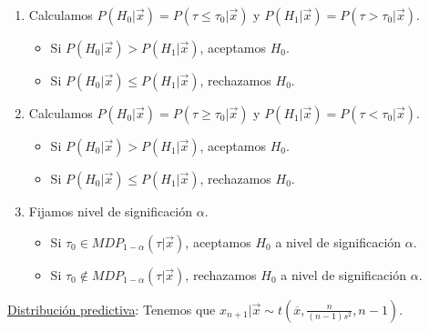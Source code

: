 \begin{enumerate}
    \item Calculamos $P(H_0 | \vec{x}) = P(\tau\leq \tau_0 |\vec{x})$ y $P(H_1 | \vec{x}) = P(\tau> \tau_0 | \vec{x})$.
          \begin{itemize}
              \item Si $P(H_0 | \vec{x}) > P(H_1 | \vec{x})$, aceptamos $H_0$.
              \item Si $P(H_0 | \vec{x}) \leq P(H_1 | \vec{x})$, rechazamos $H_0$.
          \end{itemize}
    \item Calculamos $P(H_0 | \vec{x}) = P(\tau \ge \tau_0 |\vec{x})$ y $P(H_1 | \vec{x}) = P(\tau< \tau_0 | \vec{x})$.
          \begin{itemize}
              \item Si $P(H_0 | \vec{x}) > P(H_1 | \vec{x})$, aceptamos $H_0$.
              \item Si $P(H_0 | \vec{x}) \leq P(H_1 | \vec{x})$, rechazamos $H_0$.
          \end{itemize}
    \item Fijamos nivel de significación $\alpha$.
          \begin{itemize}
              \item Si $\tau_0 \in MDP_{1 - \alpha}(\tau | \vec{x})$, aceptamos $H_0$ a nivel de significación $\alpha$.
              \item Si $\tau_0 \not\in MDP_{1 - \alpha}(\tau| \vec{x})$, rechazamos $H_0$ a nivel de significación $\alpha$.
          \end{itemize}
\end{enumerate}
\underline{Distribución predictiva}: Tenemos que $x_{n+1} | \vec{x} \sim t\left(\overline{x}, \frac{n}{(n-1)s^2},n-1 \right)$.

